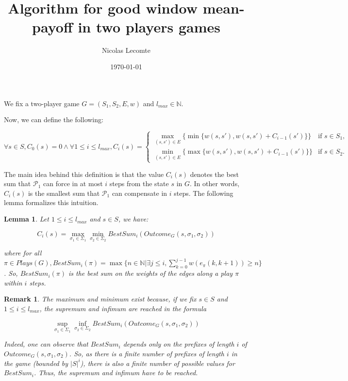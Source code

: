 \documentclass{article}
\title{Algorithm for good window mean-payoff in two players games}
\author{Nicolas Lecomte}
\date{\today}
\newcommand{\IN}{\mathbb{N}}
\theoremstyle{plain}
\newtheorem{lem}[thm]{Lemma}
\newtheorem{rem}{Remark}
\begin{document}
\maketitle

We fix a two-player game $G = (S_1, S_2, E, w)$ and $l_{max} \in \IN$.

Now, we can define the following:

\[\forall s \in S, C_0(s)=0 \wedge \forall 1 \leqslant i \leqslant l_{max}, C_i(s) =
\begin{cases}
\max_{(s, s') \in E} \{ \min \{w(s, s'), w(s, s') + C_{i-1}(s')\} \} & \text{if } s \in S_1,\\
\min_{(s, s') \in E} \{ \max \{w(s, s'), w(s, s') + C_{i-1}(s')\} \} & \text{if } s \in S_2.
\end{cases}
\]

The main idea behind this definition is that the value $C_i(s)$ denotes the best sum that $\mathcal{P}_1$ can force in at most $i$ steps from the state $s$ in $G$. In other words, $C_i(s)$ is the smallest sum that $\mathcal{P}_1$ can compensate in $i$ steps. The following lemma formalizes this intuition.

\begin{lem} \label{lem:C_i}
Let $1 \leqslant i \leqslant l_{max}$ and $s \in S$, we have:

\[ C_i(s) = \max_{\sigma_1 \in \Sigma_1} \min_{\sigma_2 \in \Sigma_2} BestSum_i(Outcome_G(s, \sigma_1, \sigma_2)) \]

where for all $\pi \in Plays(G), BestSum_i(\pi) = \max \{n \in \IN | \exists j \leqslant i, \sum_{k=0}^{j-1} w(e_\pi (k, k+1)) \geqslant n \}$. So, $BestSum_i(\pi)$ is the best sum on the weights of the edges along a play $\pi$ within $i$ steps.

\end{lem}

\begin{rem}
The maximum and minimum exist because, if we fix $s \in S$ and $1 \leqslant i \leqslant l_{max}$, the supremum and infimum are reached in the formula

$$\sup_{\sigma_1 \in \Sigma_1} \inf_{\sigma_2 \in \Sigma_2} BestSum_i(Outcome_G(s, \sigma_1, \sigma_2))$$

Indeed, one can observe that $BestSum_i$ depends only on the prefixes of length $i$ of $Outcome_G(s, \sigma_1, \sigma_2)$. So, as there is a finite number of prefixes of length $i$ in the game (bounded by $|S|^i$), there is also a finite number of possible values for $BestSum_i$. Thus, the supremum and infimum have to be reached.
\end{rem}
\end{document}

